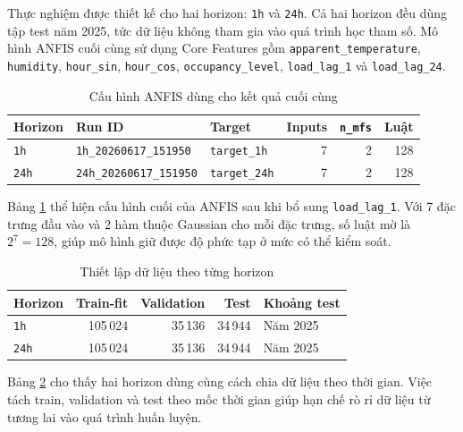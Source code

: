 Thực nghiệm được thiết kế cho hai horizon: \texttt{1h} và \texttt{24h}. Cả hai horizon đều dùng tập test năm 2025, tức dữ liệu không tham gia vào quá trình học tham số. Mô hình ANFIS cuối cùng sử dụng Core Features gồm \texttt{apparent\_temperature}, \texttt{humidity}, \texttt{hour\_sin}, \texttt{hour\_cos}, \texttt{occupancy\_level}, \texttt{load\_lag\_1} và \texttt{load\_lag\_24}.

\begin{table}[H]
  \centering
  \caption{Cấu hình ANFIS dùng cho kết quả cuối cùng}
  \begin{tabular}{p{2.1cm} p{4.4cm} p{2.7cm} r r r}
    \toprule
    \textbf{Horizon} & \textbf{Run ID} & \textbf{Target} & \textbf{Inputs} & \textbf{\texttt{n\_mfs}} & \textbf{Luật} \\
    \midrule
    \texttt{1h} & \texttt{1h\_20260617\_151950} & \texttt{target\_1h} & 7 & 2 & 128 \\
    \texttt{24h} & \texttt{24h\_20260617\_151950} & \texttt{target\_24h} & 7 & 2 & 128 \\
    \bottomrule
  \end{tabular}
  \label{tab:final_anfis_config}
\end{table}

Bảng \ref{tab:final_anfis_config} thể hiện cấu hình cuối của ANFIS sau khi bổ sung \texttt{load\_lag\_1}. Với 7 đặc trưng đầu vào và 2 hàm thuộc Gaussian cho mỗi đặc trưng, số luật mờ là $2^7=128$, giúp mô hình giữ được độ phức tạp ở mức có thể kiểm soát.

\begin{table}[H]
  \centering
  \caption{Thiết lập dữ liệu theo từng horizon}
  \begin{tabular}{p{3cm} r r r p{3cm}}
    \toprule
    \textbf{Horizon} & \textbf{Train-fit} & \textbf{Validation} & \textbf{Test} & \textbf{Khoảng test} \\
    \midrule
    \texttt{1h} & 105\,024 & 35\,136 & 34\,944 & Năm 2025 \\
    \texttt{24h} & 105\,024 & 35\,136 & 34\,944 & Năm 2025 \\
    \bottomrule
  \end{tabular}
  \label{tab:final_data_split}
\end{table}

Bảng \ref{tab:final_data_split} cho thấy hai horizon dùng cùng cách chia dữ liệu theo thời gian. Việc tách train, validation và test theo mốc thời gian giúp hạn chế rò rỉ dữ liệu từ tương lai vào quá trình huấn luyện.

